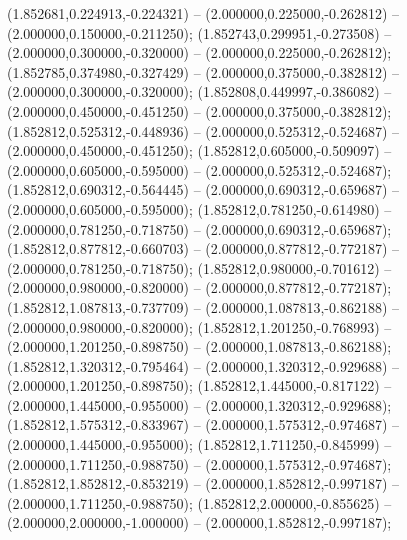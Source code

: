  (1.852681,0.224913,-0.224321) -- (2.000000,0.225000,-0.262812) -- (2.000000,0.150000,-0.211250);
 (1.852743,0.299951,-0.273508) -- (2.000000,0.300000,-0.320000) -- (2.000000,0.225000,-0.262812);
 (1.852785,0.374980,-0.327429) -- (2.000000,0.375000,-0.382812) -- (2.000000,0.300000,-0.320000);
 (1.852808,0.449997,-0.386082) -- (2.000000,0.450000,-0.451250) -- (2.000000,0.375000,-0.382812);
 (1.852812,0.525312,-0.448936) -- (2.000000,0.525312,-0.524687) -- (2.000000,0.450000,-0.451250);
 (1.852812,0.605000,-0.509097) -- (2.000000,0.605000,-0.595000) -- (2.000000,0.525312,-0.524687);
 (1.852812,0.690312,-0.564445) -- (2.000000,0.690312,-0.659687) -- (2.000000,0.605000,-0.595000);
 (1.852812,0.781250,-0.614980) -- (2.000000,0.781250,-0.718750) -- (2.000000,0.690312,-0.659687);
 (1.852812,0.877812,-0.660703) -- (2.000000,0.877812,-0.772187) -- (2.000000,0.781250,-0.718750);
 (1.852812,0.980000,-0.701612) -- (2.000000,0.980000,-0.820000) -- (2.000000,0.877812,-0.772187);
 (1.852812,1.087813,-0.737709) -- (2.000000,1.087813,-0.862188) -- (2.000000,0.980000,-0.820000);
 (1.852812,1.201250,-0.768993) -- (2.000000,1.201250,-0.898750) -- (2.000000,1.087813,-0.862188);
 (1.852812,1.320312,-0.795464) -- (2.000000,1.320312,-0.929688) -- (2.000000,1.201250,-0.898750);
 (1.852812,1.445000,-0.817122) -- (2.000000,1.445000,-0.955000) -- (2.000000,1.320312,-0.929688);
 (1.852812,1.575312,-0.833967) -- (2.000000,1.575312,-0.974687) -- (2.000000,1.445000,-0.955000);
 (1.852812,1.711250,-0.845999) -- (2.000000,1.711250,-0.988750) -- (2.000000,1.575312,-0.974687);
 (1.852812,1.852812,-0.853219) -- (2.000000,1.852812,-0.997187) -- (2.000000,1.711250,-0.988750);
 (1.852812,2.000000,-0.855625) -- (2.000000,2.000000,-1.000000) -- (2.000000,1.852812,-0.997187);
